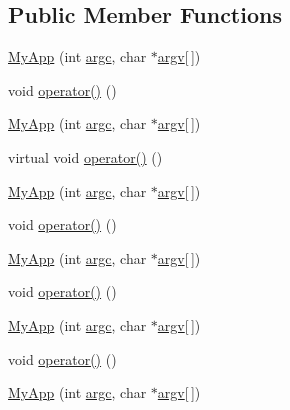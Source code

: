 \subsection*{Public Member Functions}
\begin{DoxyCompactItemize}
\item 
\hyperlink{class_my_app_a2cedcf8942b99702d5e26db7d07ff57b}{My\+App} (int \hyperlink{class_sample_generation_app_af98f6187cc8eb62fc3fe0ff53df76b6e}{argc}, char $\ast$\hyperlink{class_sample_generation_app_a7e490e3711491c2bc58351f9e9dd9945}{argv}\mbox{[}$\,$\mbox{]})
\item 
void \hyperlink{class_my_app_a376d7e3ddb7ab21223f29a7263b6fb14}{operator()} ()
\item 
\hyperlink{class_my_app_a2cedcf8942b99702d5e26db7d07ff57b}{My\+App} (int \hyperlink{class_sample_generation_app_af98f6187cc8eb62fc3fe0ff53df76b6e}{argc}, char $\ast$\hyperlink{class_sample_generation_app_a7e490e3711491c2bc58351f9e9dd9945}{argv}\mbox{[}$\,$\mbox{]})
\item 
virtual void \hyperlink{class_my_app_ab3cc458e74a9fc059504fa33983249ee}{operator()} ()
\item 
\hyperlink{class_my_app_a2cedcf8942b99702d5e26db7d07ff57b}{My\+App} (int \hyperlink{class_sample_generation_app_af98f6187cc8eb62fc3fe0ff53df76b6e}{argc}, char $\ast$\hyperlink{class_sample_generation_app_a7e490e3711491c2bc58351f9e9dd9945}{argv}\mbox{[}$\,$\mbox{]})
\item 
void \hyperlink{class_my_app_a376d7e3ddb7ab21223f29a7263b6fb14}{operator()} ()
\item 
\hyperlink{class_my_app_a2cedcf8942b99702d5e26db7d07ff57b}{My\+App} (int \hyperlink{class_sample_generation_app_af98f6187cc8eb62fc3fe0ff53df76b6e}{argc}, char $\ast$\hyperlink{class_sample_generation_app_a7e490e3711491c2bc58351f9e9dd9945}{argv}\mbox{[}$\,$\mbox{]})
\item 
void \hyperlink{class_my_app_a376d7e3ddb7ab21223f29a7263b6fb14}{operator()} ()
\item 
\hyperlink{class_my_app_a2cedcf8942b99702d5e26db7d07ff57b}{My\+App} (int \hyperlink{class_sample_generation_app_af98f6187cc8eb62fc3fe0ff53df76b6e}{argc}, char $\ast$\hyperlink{class_sample_generation_app_a7e490e3711491c2bc58351f9e9dd9945}{argv}\mbox{[}$\,$\mbox{]})
\item 
void \hyperlink{class_my_app_a376d7e3ddb7ab21223f29a7263b6fb14}{operator()} ()
\item 
\hyperlink{class_my_app_a2cedcf8942b99702d5e26db7d07ff57b}{My\+App} (int \hyperlink{class_sample_generation_app_af98f6187cc8eb62fc3fe0ff53df76b6e}{argc}, char $\ast$\hyperlink{class_sample_generation_app_a7e490e3711491c2bc58351f9e9dd9945}{argv}\mbox{[}$\,$\mbox{]})

\end{DoxyCompactItemize}
